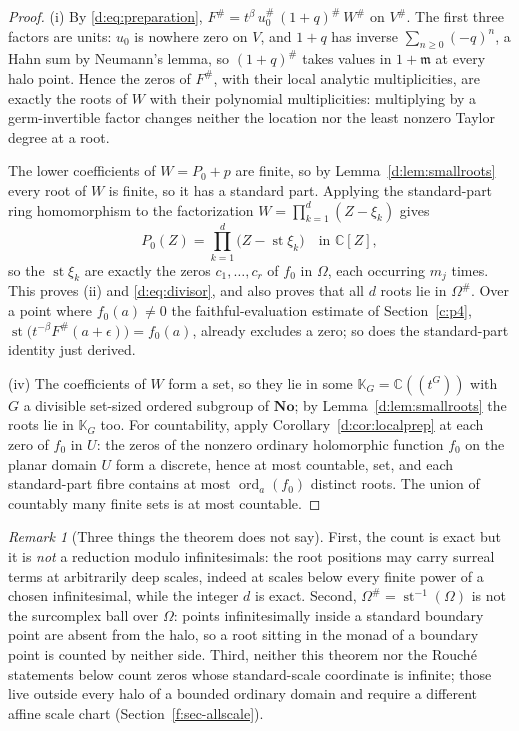 \documentclass[11pt,a4paper]{article}
\numberwithin{equation}{section}
\theoremstyle{definition}
\theoremstyle{remark}
\newtheorem{remark}[theorem]{Remark}
\theoremstyle{plain}
\newcommand{\K}{\mathbb K}
\newcommand{\No}{\mathbf{No}}
\newcommand{\CC}{\mathbb C}
\newcommand{\mm}{\mathfrak m}
\DeclareMathOperator{\st}{st}
\DeclareMathOperator{\ord}{ord}
\newcommand{\tm}{t}
\newcommand{\halo}[1]{#1^{\#}}
\newcommand{\ev}[1]{#1^{\#}}
\begin{document}
\begin{proof}
(i) By \eqref{d:eq:preparation}, $\ev F=\tm^{\beta}\,\ev{u_0}\,
\ev{(1+q)}\,\ev W$ on $\halo V$.  The first three factors are
units: $u_0$ is nowhere zero on $V$, and $1+q$ has inverse
$\sum_{n\ge0}(-q)^{n}$, a Hahn sum by Neumann's lemma, so $\ev{(1+q)}$
takes values in $1+\mm$ at every halo point.  Hence the zeros of
$\ev F$, with their local analytic multiplicities, are exactly the
roots of $W$ with their polynomial multiplicities: multiplying by a
germ-invertible factor changes neither the location nor the least
nonzero Taylor degree at a root.

The lower coefficients of $W=P_0+p$ are finite, so by
Lemma~\ref{d:lem:smallroots} every root of $W$ is finite, so it has
a standard part.  Applying the standard-part ring homomorphism to the
factorization $W=\prod_{k=1}^{d}(Z-\xi_k)$ gives
\[
 P_0(Z)=\prod_{k=1}^{d}\bigl(Z-\st\xi_k\bigr)\quad\text{in }\CC[Z],
\]
so the $\st\xi_k$ are exactly the zeros $c_1,\dots,c_r$ of $f_0$ in
$\Omega$, each occurring $m_j$ times.  This proves (ii) and
\eqref{d:eq:divisor}, and also proves that all $d$ roots lie in
$\halo\Omega$.  Over a point where $f_0(a)\ne0$ the faithful-evaluation
estimate of Section~\ref{c:p4}, $\st\bigl(\tm^{-\beta}\ev F(a+\epsilon)\bigr)=f_0(a)$,
already excludes a zero; so does the standard-part identity just
derived.

(iv) The coefficients of $W$ form a set, so they lie in some
$\K_G=\CC((\tm^{G}))$ with $G$ a divisible set-sized ordered subgroup
of $\No$; by Lemma~\ref{d:lem:smallroots} the roots lie in $\K_G$
too.  For countability, apply
Corollary~\ref{d:cor:localprep} at each zero of $f_0$ in $U$: the zeros
of the nonzero ordinary holomorphic function $f_0$ on the planar domain
$U$ form a discrete, hence at most countable, set, and each
standard-part fibre contains at most $\ord_a(f_0)$ distinct roots.  The
union of countably many finite sets is at most countable.
\end{proof}

\begin{remark}[Three things the theorem does not say]
\label{d:rem:clusterscope}
First, the count is exact but it is \emph{not} a reduction modulo
infinitesimals: the root positions may carry surreal terms at
arbitrarily deep scales, indeed at scales below every finite power of a
chosen infinitesimal, while the integer $d$ is exact.  Second,
$\halo\Omega=\st^{-1}(\Omega)$ is not the surcomplex ball over
$\Omega$: points infinitesimally inside a standard boundary point are
absent from the halo, so a root sitting in the monad of a boundary
point is counted by neither side.  Third, neither this theorem nor the
Rouch\'e statements below count zeros whose standard-scale coordinate
is infinite; those live outside every halo of a bounded ordinary domain
and require a different affine scale chart (Section~\ref{f:sec-allscale}).
\end{remark}
\end{document}
